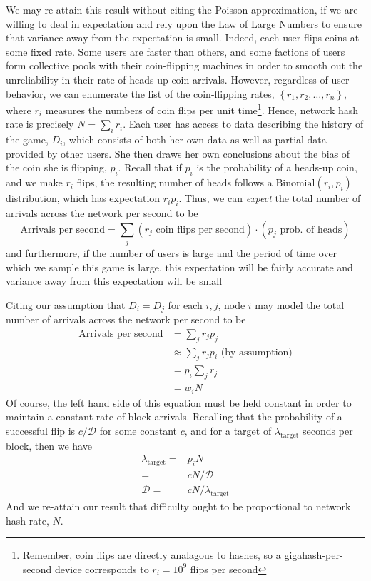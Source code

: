 \documentclass[12pt,english]{mrl}
\theoremstyle{definition}
\numberwithin{equation}{section}
\numberwithin{figure}{section}
\numberwithin{equation}{section}
\numberwithin{equation}{section}
\numberwithin{figure}{section}
\begin{document}
We may re-attain this result without citing the Poisson approximation, if we are willing to deal in expectation and rely upon the Law of Large Numbers to ensure that variance away from the expectation is small. Indeed, each user flips coins at some fixed rate. Some users are faster than others, and some factions of users form collective pools with their coin-flipping machines in order to smooth out the unreliability in their rate of heads-up coin arrivals. However, regardless of user behavior, we can enumerate the list of the coin-flipping rates, $\left\{r_1, r_2, \ldots, r_n\right\}$, where $r_i$ measures the numbers of coin flips per unit time\footnote{Remember, coin flips are directly analagous to hashes, so a gigahash-per-second device corresponds to $r_i = 10^9$ flips per second}. Hence, network hash rate is precisely $N=\sum_i r_i$. Each user has access to data  describing the history of the game, $D_i$, which consists of both her own data as well as partial data provided by other users. She then draws her own conclusions about the bias of the coin she is flipping, $p_i$. Recall that if $p_i$ is the probability of a heads-up coin, and we make $r_i$ flips, the resulting number of heads follows a $\text{Binomial}(r_i,p_i)$ distribution, which has expectation $r_i p_i$. Thus, we can \textit{expect} the total number of arrivals across the network per second to be
$$\text{Arrivals per second} = \sum_j (r_j\text{ coin flips per second})\cdot (p_j\text{ prob. of heads})$$
and furthermore, if the number of users is large and the period of time over which we sample this game is large, this expectation will be fairly accurate and variance away from this expectation will be small

Citing our assumption that $D_i = D_j$ for each $i,j$, node $i$ may model the total number of arrivals across the network per second to be
\begin{align*}\text{Arrivals per second} &= \sum_j r_j p_j\\
&\approx \sum_j r_j p_i\text{ (by assumption)}\\
&= p_i \sum_j r_j \\
&= w_i N
\end{align*}
Of course, the left hand side of this equation must be held constant in order to maintain a constant rate of block arrivals. Recalling that the probability of a successful flip is $c/\mathcal{D}$ for some constant $c$, and for a target of $\lambda_{\text{target}}$ seconds per block, then we have
\begin{align*}
\lambda_{\text{target}} =& p_i N\\
=& cN/\mathcal{D}\\
\mathcal{D} =& cN/\lambda_{\text{target}}
\end{align*}
And we re-attain our result that difficulty ought to be proportional to network hash rate, $N$.
\end{document}
